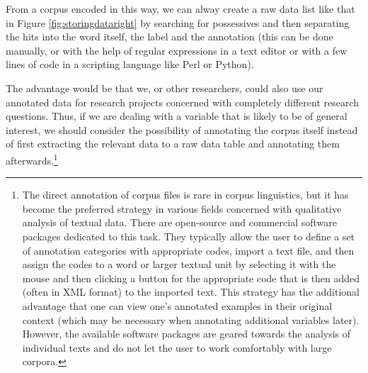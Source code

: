From a corpus encoded in this way, we can alway create a raw data list like that in Figure \ref{fig:storingdataright} by searching for possessives and then separating the hits into the word itself, the  label and the  annotation (this can be done manually, or with the help of regular expressions in a text editor or with a few lines of code in a scripting language like Perl or Python).

The advantage would be that we, or other researchers, could also use our annotated data for research projects concerned with completely different research questions. Thus, if we are dealing with a variable that is likely to be of general interest, we should consider the possibility of annotating the corpus itself instead of first extracting the relevant data to a raw data table and annotating them afterwards.\footnote{The direct annotation of corpus files is rare in corpus linguistics, but it has become the preferred strategy in various fields concerned with qualitative analysis of textual data. There are open-source and commercial software packages dedicated to this task. They typically allow the user to define a set of annotation categories with appropriate codes, import a text file, and then assign the codes to a word or larger textual unit by selecting it with the mouse and then clicking a button for the appropriate code that is then added (often in XML format) to the imported text. This strategy has the additional advantage that one can view one's annotated examples in their original context (which may be necessary when annotating additional variables later). However, the available software packages are geared towards the analysis of individual texts and do not let the user to work comfortably with large corpora.}
